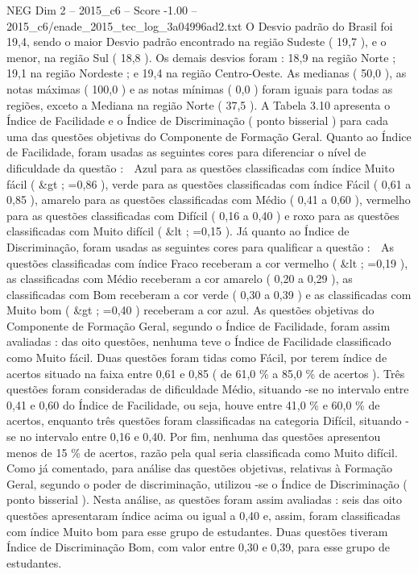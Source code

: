 \begin{textsample}{NEG Dim 2 – 2015\_c6 – Score -1.00 – 2015\_c6/enade\_2015\_tec\_log\_3a04996ad2.txt}
O Desvio padrão do Brasil foi 19,4, sendo o maior Desvio padrão encontrado na região Sudeste ( 19,7 ), e o menor, na região Sul ( 18,8 ).
Os demais desvios foram : 18,9 na região Norte ; 19,1 na região Nordeste ; e 19,4 na região Centro-Oeste.
As medianas ( 50,0 ), as notas máximas ( 100,0 ) e as notas mínimas ( 0,0 ) foram iguais para todas as regiões, exceto a Mediana na região Norte ( 37,5 ).
A Tabela 3.10 apresenta o Índice de Facilidade e o Índice de Discriminação ( ponto bisserial ) para cada uma das questões objetivas do Componente de Formação Geral.
Quanto ao Índice de Facilidade, foram usadas as seguintes cores para diferenciar o nível de dificuldade da questão :  Azul para as questões classificadas com índice Muito fácil ( \&gt ; =0,86 ), verde para as questões classificadas com índice Fácil ( 0,61 a 0,85 ), amarelo para as questões classificadas com Médio ( 0,41 a 0,60 ), vermelho para as questões classificadas com Difícil ( 0,16 a 0,40 ) e roxo para as questões classificadas com Muito difícil ( \&lt ; =0,15 ).
Já quanto ao Índice de Discriminação, foram usadas as seguintes cores para qualificar a questão :  As questões classificadas com índice Fraco receberam a cor vermelho ( \&lt ; =0,19 ), as classificadas com Médio receberam a cor amarelo ( 0,20 a 0,29 ), as classificadas com Bom receberam a cor verde ( 0,30 a 0,39 ) e as classificadas com Muito bom ( \&gt ; =0,40 ) receberam a cor azul.
As questões objetivas do Componente de Formação Geral, segundo o Índice de Facilidade, foram assim avaliadas : das oito questões, nenhuma teve o Índice de Facilidade classificado como Muito fácil.
Duas questões foram tidas como Fácil, por terem índice de acertos situado na faixa entre 0,61 e 0,85 ( de 61,0 \% a 85,0 \% de acertos ).
Três questões foram consideradas de dificuldade Médio, situando -se no intervalo entre 0,41 e 0,60 do Índice de Facilidade, ou seja, houve entre 41,0 \% e 60,0 \% de acertos, enquanto três questões foram classificadas na categoria Difícil, situando -se no intervalo entre 0,16 e 0,40.
Por fim, nenhuma das questões apresentou menos de 15 \% de acertos, razão pela qual seria classificada como Muito difícil.
Como já comentado, para análise das questões objetivas, relativas à Formação Geral, segundo o poder de discriminação, utilizou -se o Índice de Discriminação ( ponto bisserial ).
Nesta análise, as questões foram assim avaliadas : seis das oito questões apresentaram índice acima ou igual a 0,40 e, assim, foram classificadas com índice Muito bom para esse grupo de estudantes.
Duas questões tiveram Índice de Discriminação Bom, com valor entre 0,30 e 0,39, para esse grupo de estudantes.

\end{textsample}
